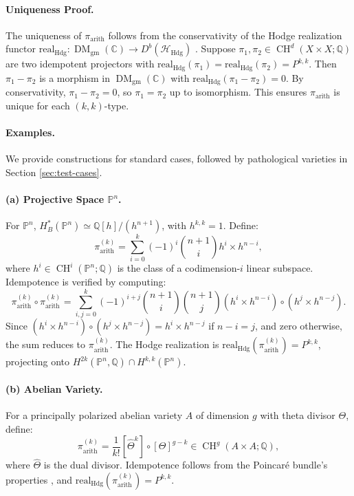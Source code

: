 \documentclass[11pt]{article}
\DeclareMathOperator{\CH}{CH}
\DeclareMathOperator{\DM}{DM}
\begin{document}
\paragraph{Uniqueness Proof.}
The uniqueness of \(\pi_{\mathrm{arith}}\) follows from the conservativity of the Hodge realization functor \(\mathrm{real}_{\mathrm{Hdg}}: \DM_{\mathrm{gm}}(\mathbb{C}) \to D^b(\mathcal{H}_{\mathrm{Hdg}})\) \cite{cisinski2019triangulated}. Suppose \(\pi_1, \pi_2 \in \CH^d(X \times X; \mathbb{Q})\) are two idempotent projectors with \(\mathrm{real}_{\mathrm{Hdg}}(\pi_1) = \mathrm{real}_{\mathrm{Hdg}}(\pi_2) = P^{k,k}\). Then \(\pi_1 - \pi_2\) is a morphism in \(\DM_{\mathrm{gm}}(\mathbb{C})\) with \(\mathrm{real}_{\mathrm{Hdg}}(\pi_1 - \pi_2) = 0\). By conservativity, \(\pi_1 - \pi_2 = 0\), so \(\pi_1 = \pi_2\) up to isomorphism. This ensures \(\pi_{\mathrm{arith}}\) is unique for each \((k,k)\)-type.

\paragraph{Examples.}
We provide constructions for standard cases, followed by pathological varieties in Section \ref{sec:test-cases}.

\paragraph{(a) Projective Space \(\mathbb{P}^n\).}
For \(\mathbb{P}^n\), \(H_B^*(\mathbb{P}^n) \simeq \mathbb{Q}[h]/(h^{n+1})\), with \(h^{k,k} = 1\). Define:
\[
\pi_{\mathrm{arith}}^{(k)} = \sum_{i=0}^k (-1)^i \binom{n+1}{i} h^i \times h^{n-i},
\]
where \(h^i \in \CH^i(\mathbb{P}^n; \mathbb{Q})\) is the class of a codimension-\(i\) linear subspace. Idempotence is verified by computing:
\[
\pi_{\mathrm{arith}}^{(k)} \circ \pi_{\mathrm{arith}}^{(k)} = \sum_{i,j=0}^k (-1)^{i+j} \binom{n+1}{i} \binom{n+1}{j} (h^i \times h^{n-i}) \circ (h^j \times h^{n-j}).
\]
Since \((h^i \times h^{n-i}) \circ (h^j \times h^{n-j}) = h^i \times h^{n-j}\) if \(n-i = j\), and zero otherwise, the sum reduces to \(\pi_{\mathrm{arith}}^{(k)}\). The Hodge realization is \(\mathrm{real}_{\mathrm{Hdg}}(\pi_{\mathrm{arith}}^{(k)}) = P^{k,k}\), projecting onto \(H^{2k}(\mathbb{P}^n, \mathbb{Q}) \cap H^{k,k}(\mathbb{P}^n)\).

\paragraph{(b) Abelian Variety.}
For a principally polarized abelian variety \(A\) of dimension \(g\) with theta divisor \(\Theta\), define:
\[
\pi_{\mathrm{arith}}^{(k)} = \frac{1}{k!} [\widehat{\Theta}^k] \circ [\Theta]^{g-k} \in \CH^g(A \times A; \mathbb{Q}),
\]
where \(\widehat{\Theta}\) is the dual divisor. Idempotence follows from the Poincaré bundle’s properties \cite{deligne1971}, and \(\mathrm{real}_{\mathrm{Hdg}}(\pi_{\mathrm{arith}}^{(k)}) = P^{k,k}\).
\end{document}

